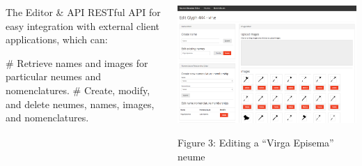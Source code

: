 \documentclass[final]{beamer}
\newlength{\onecolwid}
\newcommand{\blockSpace}{\vskip 0.75ex}
\begin{document}
\begin{frame}[fragile,t]
\begin{columns}
\begin{column}{\onecolwid}
\begin{block}{The Editor \& API}
RESTful API for easy integration with external client applications, which can:
\begin{easylist}[itemize]
# Retrieve names and images for particular neumes and nomenclatures.
# Create, modify, and delete  neumes, names, images, and nomenclatures.
\end{easylist}
\end{block}
\end{column}

\begin{column}{\onecolwid}
\begin{block}{}
\centering
\includegraphics[width=\onecolwid]{images/web-interface.png} 

Figure 3: Editing a ``Virga Episema'' neume
\end{block}

\end{column}
\end{columns}


\begin{columns}
\end{columns}
\end{frame}
\end{document}
